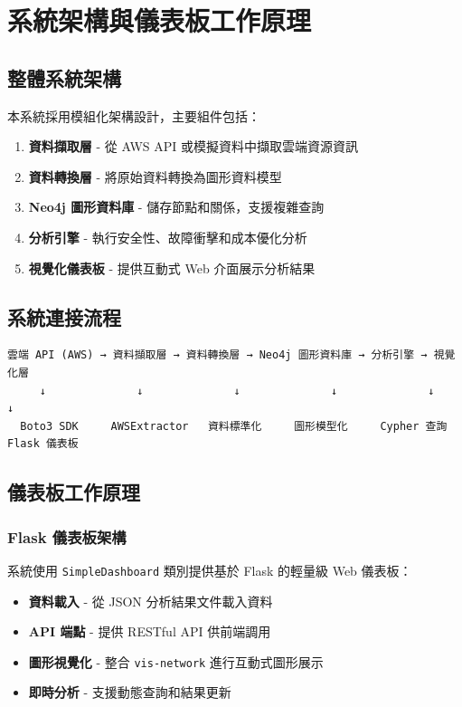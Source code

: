 \documentclass[11pt,a4paper]{ctexart}
\begin{document}
\clearpage
\section{系統架構與儀表板工作原理}

\subsection{整體系統架構}

本系統採用模組化架構設計，主要組件包括：

\begin{enumerate}[leftmargin=1.5em]
\item \textbf{資料擷取層} - 從 AWS API 或模擬資料中擷取雲端資源資訊
\item \textbf{資料轉換層} - 將原始資料轉換為圖形資料模型
\item \textbf{Neo4j 圖形資料庫} - 儲存節點和關係，支援複雜查詢
\item \textbf{分析引擎} - 執行安全性、故障衝擊和成本優化分析
\item \textbf{視覺化儀表板} - 提供互動式 Web 介面展示分析結果
\end{enumerate}

\subsection{系統連接流程}

\begin{verbatim}
雲端 API (AWS) → 資料擷取層 → 資料轉換層 → Neo4j 圖形資料庫 → 分析引擎 → 視覺化層
     ↓              ↓              ↓              ↓              ↓           ↓
  Boto3 SDK     AWSExtractor   資料標準化     圖形模型化     Cypher 查詢   Flask 儀表板
\end{verbatim}

\subsection{儀表板工作原理}

\subsubsection{Flask 儀表板架構}

系統使用 \texttt{SimpleDashboard} 類別提供基於 Flask 的輕量級 Web 儀表板：

\begin{itemize}[leftmargin=1.5em]
\item \textbf{資料載入} - 從 JSON 分析結果文件載入資料
\item \textbf{API 端點} - 提供 RESTful API 供前端調用
\item \textbf{圖形視覺化} - 整合 \texttt{vis-network} 進行互動式圖形展示
\item \textbf{即時分析} - 支援動態查詢和結果更新
\end{itemize}
\end{document}
